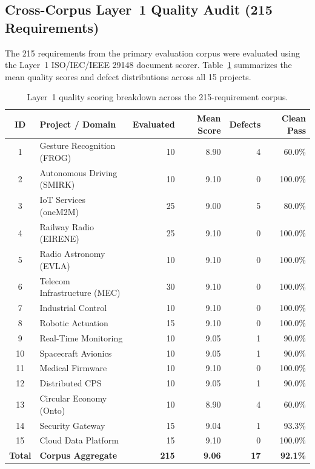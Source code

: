 \documentclass[journal]{IEEEtran}
\begin{document}
\subsection{Cross-Corpus Layer~1 Quality Audit (215 Requirements)}
\label{sec:layer1-sweep}

The 215 requirements from the primary evaluation corpus were evaluated using the Layer~1 ISO/IEC/IEEE 29148 document scorer. Table~\ref{tab:layer1-breakdown} summarizes the mean quality scores and defect distributions across all 15 projects.

\begin{table}[htbp]
\centering
\caption{Layer~1 quality scoring breakdown across the 215-requirement corpus.}
\label{tab:layer1-breakdown}
\small
\setlength{\tabcolsep}{3pt}
\begin{tabularx}{\columnwidth}{@{}c>{\raggedright\arraybackslash}Xrrrr@{}}
\toprule
\textbf{ID} & \textbf{Project / Domain} & \textbf{Evaluated} & \textbf{Mean Score} & \textbf{Defects} & \textbf{Clean Pass} \\
\midrule
1  & Gesture Recognition (FROG)       & 10 & 8.90 & 4 & 60.0\% \\
2  & Autonomous Driving (SMIRK)       & 10 & 9.10 & 0 & 100.0\% \\
3  & IoT Services (oneM2M)            & 25 & 9.00 & 5 & 80.0\% \\
4  & Railway Radio (EIRENE)           & 25 & 9.10 & 0 & 100.0\% \\
5  & Radio Astronomy (EVLA)           & 10 & 9.10 & 0 & 100.0\% \\
6  & Telecom Infrastructure (MEC)     & 30 & 9.10 & 0 & 100.0\% \\
7  & Industrial Control               & 10 & 9.10 & 0 & 100.0\% \\
8  & Robotic Actuation                & 15 & 9.10 & 0 & 100.0\% \\
9  & Real-Time Monitoring             & 10 & 9.05 & 1 & 90.0\% \\
10 & Spacecraft Avionics              & 10 & 9.05 & 1 & 90.0\% \\
11 & Medical Firmware                 & 10 & 9.10 & 0 & 100.0\% \\
12 & Distributed CPS                  & 10 & 9.05 & 1 & 90.0\% \\
13 & Circular Economy (Onto)          & 10 & 8.90 & 4 & 60.0\% \\
14 & Security Gateway                 & 15 & 9.04 & 1 & 93.3\% \\
15 & Cloud Data Platform              & 15 & 9.10 & 0 & 100.0\% \\
\midrule
\textbf{Total} & \textbf{Corpus Aggregate} & \textbf{215} & \textbf{9.06} & \textbf{17} & \textbf{92.1\%} \\
\bottomrule
\end{tabularx}
\end{table}
\end{document}
